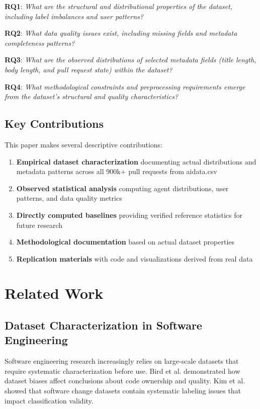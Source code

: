 \documentclass[conference]{IEEEtran}
\begin{document}
\textbf{RQ1}: \textit{What are the structural and distributional properties of the dataset, including label imbalances and user patterns?}

\textbf{RQ2}: \textit{What data quality issues exist, including missing fields and metadata completeness patterns?}

\textbf{RQ3}: \textit{What are the observed distributions of selected metadata fields (title length, body length, and pull request state) within the dataset?}

\textbf{RQ4}: \textit{What methodological constraints and preprocessing requirements emerge from the dataset's structural and quality characteristics?}

\subsection{Key Contributions}

This paper makes several descriptive contributions:
\begin{enumerate}
    \item \textbf{Empirical dataset characterization} documenting actual distributions and metadata patterns across all 900k+ pull requests from aidata.csv
    \item \textbf{Observed statistical analysis} computing agent distributions, user patterns, and data quality metrics
    \item \textbf{Directly computed baselines} providing verified reference statistics for future research
    \item \textbf{Methodological documentation} based on actual dataset properties
    \item \textbf{Replication materials} with code and visualizations derived from real data
\end{enumerate}

\section{Related Work}

\subsection{Dataset Characterization in Software Engineering}

Software engineering research increasingly relies on large-scale datasets that require systematic characterization before use. Bird et al. \cite{bird2011dont} demonstrated how dataset biases affect conclusions about code ownership and quality. Kim et al. \cite{kim2008classifying} showed that software change datasets contain systematic labeling issues that impact classification validity.
\end{document}
